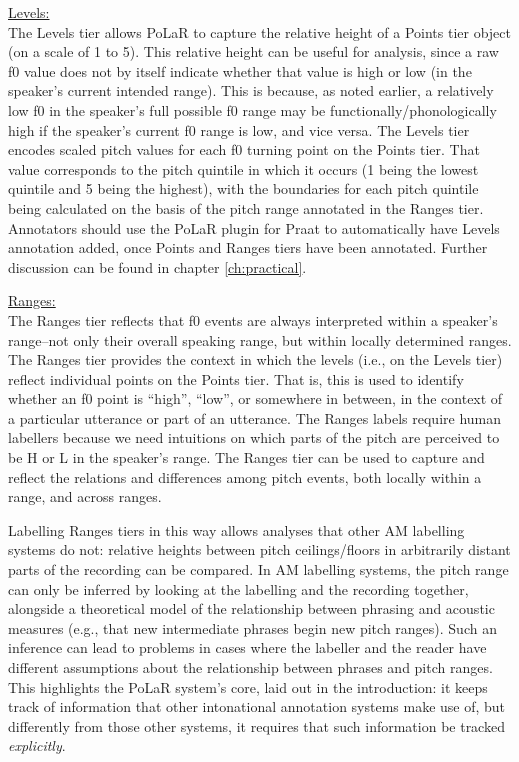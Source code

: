 \uline{Levels:}\\ The Levels tier allows PoLaR to capture the relative height of a Points tier object (on a scale of 1 to 5). This relative height can be useful for analysis, since a raw f0 value does not by itself indicate whether that value is high or low (in the speaker’s current intended range). This is because, as noted earlier, a relatively low f0 in the speaker’s full possible f0 range may be functionally\slash phonologically high if the speaker’s current f0 range is low, and vice versa. The Levels tier encodes scaled pitch values for each f0 turning point on the Points tier. That value corresponds to the pitch quintile in which it occurs (1 being the lowest quintile and 5 being the highest), with the boundaries for each pitch quintile being calculated on the basis of the pitch range annotated in the Ranges tier. Annotators should use the PoLaR plugin for Praat to automatically have Levels annotation added, once Points and Ranges tiers have been annotated. Further discussion can be found in chapter \ref{ch:practical}.

\uline{Ranges:}\\ The Ranges tier reflects that f0 events are always interpreted within a speaker’s range--not only their overall speaking range, but within locally determined ranges. The Ranges tier provides the context in which the levels (i.e., on the Levels tier) reflect individual points on the Points tier. That is, this is used to identify whether an f0 point is “high”, “low”, or somewhere in between, in the context of a particular utterance or part of an utterance. The Ranges labels require human labellers because we need intuitions on which parts of the pitch are perceived to be H or L in the speaker’s range. The Ranges tier can be used to capture and reflect the relations and differences among pitch events, both locally within a range, and across ranges.

Labelling Ranges tiers in this way allows analyses that other AM labelling systems do not: relative heights between pitch ceilings\slash floors in arbitrarily distant parts of the recording can be compared. In AM labelling systems, the pitch range can only be inferred by looking at the labelling and the recording together, alongside a theoretical model of the relationship between phrasing and acoustic measures (e.g., that new intermediate phrases begin new pitch ranges). Such an inference can lead to problems in cases where the labeller and the reader have different assumptions about the relationship between phrases and pitch ranges. This highlights the PoLaR system’s core, laid out in the introduction: it keeps track of information that other intonational annotation systems make use of, but differently from those other systems, it requires that such information be tracked \emph{explicitly}.

